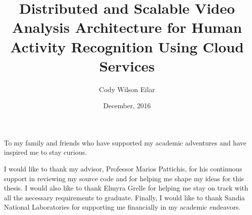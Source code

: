 \documentclass[botnum, fleqn, final]{unmeethesis}
\begin{document}

  \begin{figure}
 \centering
 
\end{figure}
  \frontmatter



  \title{Distributed and Scalable Video Analysis Architecture
  for Human Activity Recognition Using Cloud Services}

  \author{Cody Wilson Eilar}
  \date{December, 2016}

  \maketitle


  \begin{dedication}
    To my family and friends who have supported my academic adventures and
    have inspired me to stay curious. 
  \end{dedication}


  \begin{acknowledgments}
    \vspace{1.1in}
    I would like to thank my advisor, Professor Marios Pattichis, for his
    continuous support in reviewing my source code and for helping me shape my
    ideas for this thesis. I would also like to thank Elmyra Grelle for helping
    me stay on track with all the necessary requirements to graduate. Finally, I
    would like to thank Sandia National Laboratories for supporting me
    financially in my academic endeavors.
  \end{acknowledgments}

  \maketitleabstract %
\end{document}
